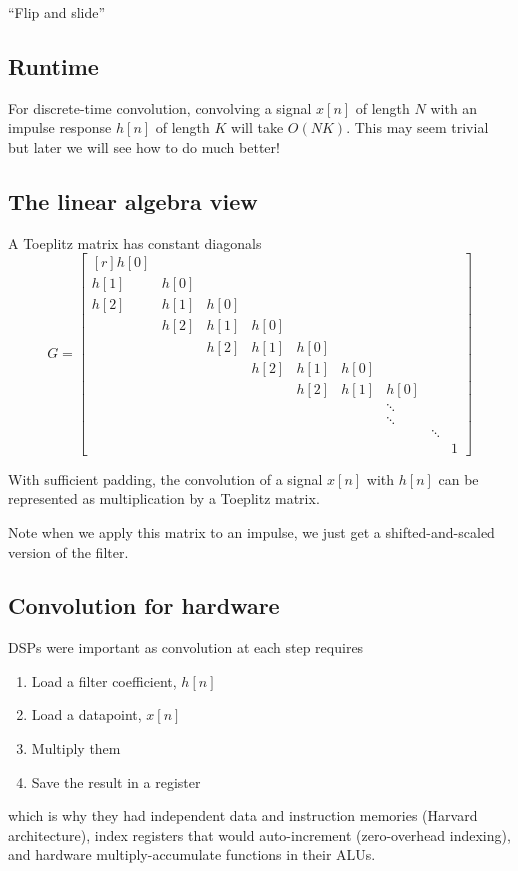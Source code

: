 ``Flip and slide'' 

\subsection{Runtime}

For discrete-time convolution, convolving a
signal $x[n]$ of length $N$ with an impulse response
$h[n]$ of length $K$ will take $O(NK)$. This 
may seem trivial but later we will see how to do 
much better! 


\subsection{The linear algebra view}
A Toeplitz matrix has constant diagonals
\[ %
 G = 
 \begin{bmatrix*}[r]
    h[0] \\
    h[1] &h[0]\\
    h[2] &h[1] & h[0]\\
    &h[2] &h[1] & h[0]\\
    &&h[2] &h[1] & h[0]\\
    &&&h[2] &h[1] & h[0]\\
    &&&&h[2] &h[1] & h[0]\\
    &&&&&&\ddots\\
    &&&&&&\ddots\\
    &&&&&&&\ddots\\
    &&&&&&&&1
  \end{bmatrix*}
\]

With sufficient padding, the convolution of a signal $x[n]$ with
$h[n]$ can be represented as multiplication by a Toeplitz matrix. 

Note when we apply this matrix to an impulse, we just
get a shifted-and-scaled version of the filter.  

\subsection{Convolution for hardware} 
DSPs were important as convolution at each step requires
\begin{enumerate}
\item Load a filter coefficient, $h[n]$
\item Load a datapoint, $x[n]$
\item Multiply them 
\item Save the result in a register
\end{enumerate}

which is why they had independent data and instruction
memories (Harvard architecture), index registers that would
auto-increment (zero-overhead indexing), and hardware
multiply-accumulate functions in their ALUs. 



